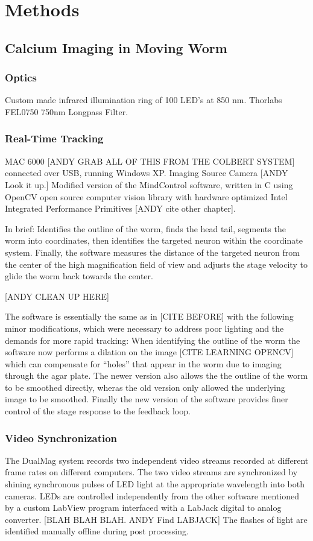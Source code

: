 \section{Methods}


\subsection{Calcium Imaging in Moving Worm}
\subsubsection{Optics}
Custom made infrared illumination ring of 100 LED's at 850 nm. 
Thorlabs FEL0750  750nm Longpass Filter.



\subsubsection{Real-Time Tracking}
MAC 6000 [ANDY GRAB ALL OF THIS FROM THE COLBERT SYSTEM] connected over USB, running Windows XP. 
Imaging Source Camera [ANDY Look it up.]
Modified version of the MindControl software, written in C using OpenCV open source computer vision library with hardware optimized Intel Integrated Performance Primitives [ANDY cite other chapter]. 

In brief:
Identifies the outline of the worm, finds the head tail, segments the worm into coordinates, then identifies the targeted neuron within the coordinate system. Finally, the software measures the distance of the targeted neuron from the center of the high magnification field of view and adjusts the stage velocity to glide the worm back towards the center. 

[ANDY CLEAN UP HERE]


The software is essentially the same as in [CITE BEFORE] with the following minor modifications, which were necessary to address poor lighting and the demands for more rapid tracking: When identifying the outline of the worm the software now performs a dilation on the image [CITE LEARNING OPENCV] which can compensate for ``holes'' that appear in the worm due to imaging through the agar plate. The newer version also allows the the outline of the worm to be smoothed directly, wheras the old version only allowed the underlying image to be smoothed. Finally the new version of the software provides finer control of the stage response to the feedback loop. 




\subsubsection{Video Synchronization}
The DualMag system records two independent video streams recorded at different frame rates on different computers. The two video streams are synchronized by shining synchronous pulses of LED light at the appropriate wavelength into both cameras. LEDs are controlled independently from the other software mentioned by a custom LabView program  interfaced with a LabJack digital to analog converter. [BLAH BLAH BLAH. ANDY Find LABJACK] The flashes of light are identified manually offline during post processing. 

